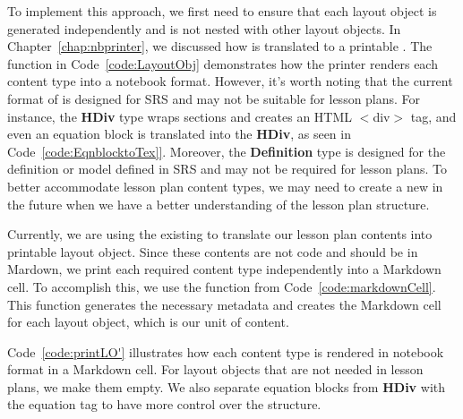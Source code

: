 To implement this approach, we first need to ensure that each layout object 
is generated independently and is not nested with other layout objects. In 
Chapter~\ref{chap:nbprinter}, we discussed how  is 
translated to a printable . The  function in 
Code~\ref{code:LayoutObj} demonstrates how the printer renders each content 
type into a notebook format. However, it's worth noting that the current format 
of  is designed for SRS and may not be suitable for lesson 
plans. For instance, the \textbf{HDiv} type wraps sections and creates an HTML 
$<$div$>$ tag, and even an equation block is translated into the \textbf{HDiv}, 
as seen in Code~\ref{code:EqnblocktoTex]}. Moreover, the \textbf{Definition} 
type is designed for the definition or model defined in SRS and may not be 
required for lesson plans. To better accommodate lesson plan content types, we 
may need to create a new  in the future when we have a 
better understanding of the lesson plan structure.

Currently, we are using the existing  to translate our 
lesson plan contents into printable layout object. Since these contents are not 
code and should be in Mardown, we print each required content type 
independently into a Markdown cell. To accomplish this, we use the 
 function from Code~\ref{code:markdownCell}. This function 
generates the necessary metadata and creates the Markdown cell for each layout 
object, which is our unit of content. 

Code~\ref{code:printLO'} illustrates how each content type is rendered in 
notebook format in a Markdown cell. For layout objects that are not needed in 
lesson plans, we make them empty. We also separate equation blocks from 
\textbf{HDiv} with the equation tag to have more control over the structure.

